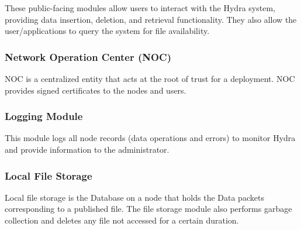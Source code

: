 These public-facing modules allow users to interact with the Hydra system, providing data insertion, deletion, and retrieval functionality. They also allow the user/applications to query the system for file availability. 

\subsubsection{Network Operation Center (NOC)}
NOC is a centralized entity that acts at the root of trust for a deployment. NOC provides signed certificates to the nodes and users. %

\subsubsection{Logging Module}

This module logs all node records (data operations and errors) to monitor Hydra and provide information to the administrator.

\subsubsection{Local File Storage}
Local file storage is the Database on a node that holds the Data packets corresponding to a published file. The file storage module also performs garbage collection and deletes any file not accessed for a certain duration.
